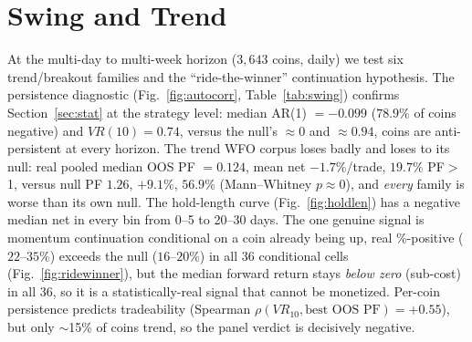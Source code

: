 \documentclass[12pt]{article}
\begin{document}
\section{Swing and Trend}\label{sec:swing}
At the multi-day to multi-week horizon ($3{,}643$ coins, daily) we test six trend/breakout families and the ``ride-the-winner'' continuation hypothesis. The persistence diagnostic (Fig.~\ref{fig:autocorr}, Table~\ref{tab:swing}) confirms Section~\ref{sec:stat} at the strategy level: median AR(1) $=-0.099$ ($78.9\%$ of coins negative) and $VR(10)=0.74$, versus the null's $\approx0$ and $\approx0.94$, coins are anti-persistent at every horizon. The trend WFO corpus loses badly and loses to its null: real pooled median OOS PF $=0.124$, mean net $-1.7\%$/trade, $19.7\%$ PF$>$1, versus null PF $1.26$, $+9.1\%$, $56.9\%$ (Mann--Whitney $p\!\approx\!0$), and \emph{every} family is worse than its own null. The hold-length curve (Fig.~\ref{fig:holdlen}) has a negative median net in every bin from 0--5 to 20--30 days. The one genuine signal is momentum continuation conditional on a coin already being up, real \%-positive ($22$--$35\%$) exceeds the null ($16$--$20\%$) in all 36 conditional cells (Fig.~\ref{fig:ridewinner}), but the median forward return stays \emph{below zero} (sub-cost) in all 36, so it is a statistically-real signal that cannot be monetized. Per-coin persistence predicts tradeability (Spearman $\rho(VR_{10},\text{best OOS PF})=+0.55$), but only $\sim$15\% of coins trend, so the panel verdict is decisively negative.
\end{document}
